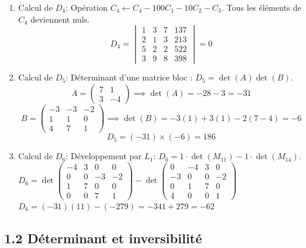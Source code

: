 \documentclass[french]{yLectureNote}
\begin{document}
\begin{enumerate}
    \item Calcul de $D_{4}$:
    Opération $C_4 \leftarrow C_4 - 100 C_1 - 10 C_2 - C_3$. Tous les éléments de $C_4$ deviennent nuls.
    $$D_{4}=\begin{vmatrix}1&3&7&137\\ 2&1&3&213\\ 5&2&2&522\\ 3&9&8&398\end{vmatrix} = 0$$

    \item Calcul de $D_{5}$:
    Déterminant d'une matrice bloc : $D_{5} = \det(A) \det(B)$.
    $$A = \begin{pmatrix} 7 & 1 \\ 3 & -4 \end{pmatrix} \implies \det(A) = -28 - 3 = -31$$
    $$B = \begin{pmatrix} -3 & -3 & -2 \\ 1 & 1 & 0 \\ 4 & 7 & 1 \end{pmatrix} \implies \det(B) = -3(1) + 3(1) - 2(7-4) = -6$$
    $$D_{5} = (-31) \times (-6) = 186$$

    \item Calcul de $D_{6}$:
    Développement par $L_1$: $D_{6} = 1 \cdot \det(M_{11}) - 1 \cdot \det(M_{14})$.
    $D_{6} = \det \begin{pmatrix}-4&3&0&0\\ 0&0&-3&-2\\ 1&7&0&0\\ 0&0&7&1\end{pmatrix} - \det \begin{pmatrix}0&-4&3&0\\ -3&0&0&-2\\ 0&1&7&0\\ 4&0&0&1\end{pmatrix}$
    $D_{6} = (-31)(11) - (-279) = -341 + 279 = -62$
\end{enumerate}

\subsection{1.2 Déterminant et inversibilité}
\end{document}
